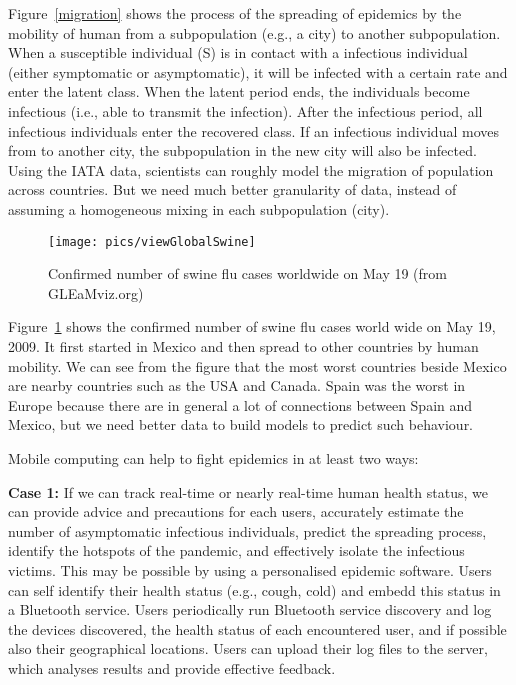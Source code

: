 \documentclass{sig-alternate-10pt}
\begin{document}
Figure~\ref{migration} shows the process of the spreading of epidemics
by the mobility of human from a subpopulation (e.g., a city) to
another subpopulation. When a susceptible individual (S) is in contact
with a infectious individual (either symptomatic or asymptomatic), it
will be infected with a certain rate and enter the latent class. When
the latent period ends, the individuals become infectious (i.e., able
to transmit the infection). After the infectious period, all
infectious individuals enter the recovered class. If an infectious
individual moves from to another city, the subpopulation in the new
city will also be infected. Using the IATA data, scientists can
roughly model the migration of population across countries. But we need
much better granularity of data, instead of assuming a homogeneous mixing
in each subpopulation (city).
\begin{figure}[t]
\begin{center}
\texttt{[image: pics/viewGlobalSwine]}\vspace{-1mm}
\caption{\label{viewGlobalSwine} Confirmed number of swine flu cases worldwide on May 19 (from GLEaMviz.org)}
\vspace{-3mm}
\end{center}
\vspace{-4mm}
\end{figure}

Figure~\ref{viewGlobalSwine} shows the confirmed number of swine flu
cases world wide on May 19, 2009. It first started in Mexico and then
spread to other countries by human mobility. We can see from the
figure that the most worst countries beside Mexico are nearby
countries such as the USA and Canada. Spain was the worst in Europe
because there are in general a lot of connections between Spain and
Mexico, but we need better data to build models to predict such
behaviour.


Mobile computing can help to fight epidemics in at least two ways:

\textbf{Case 1:} If we can track real-time or nearly real-time human
health status, we can provide advice and precautions for each users,
accurately estimate the number of asymptomatic infectious individuals,
predict the spreading process, identify the hotspots of the
pandemic, and effectively isolate the infectious victims. This may be
possible by using a personalised epidemic software. Users can self
identify their health status (e.g., cough, cold) and embedd this
status in a Bluetooth service. Users periodically run Bluetooth service
discovery and log the devices discovered, the health
status of each encountered user, and if possible also their geographical
locations. Users can upload their log files to the server, which
analyses results and provide effective feedback.
\end{document}
